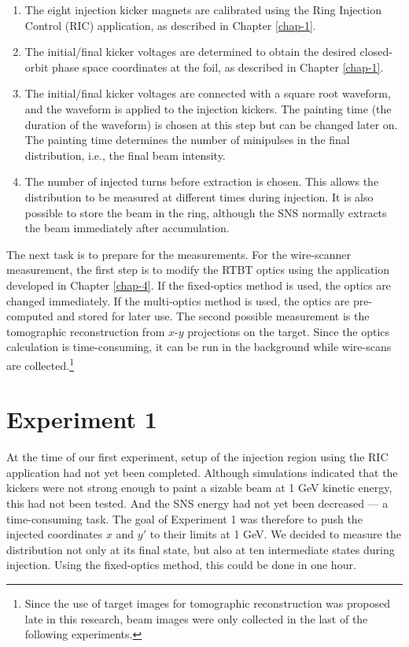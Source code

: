 \begin{enumerate}
    \item
    The eight injection kicker magnets are calibrated using the Ring Injection Control (RIC) application, as described in Chapter \ref{chap-1}. 
    \item
    The initial/final kicker voltages are determined to obtain the desired closed-orbit phase space coordinates at the foil, as described in Chapter \ref{chap-1}.
    \item
    The initial/final kicker voltages are connected with a square root waveform, and the waveform is applied to the injection kickers. The painting time (the duration of the waveform) is chosen at this step but can be changed later on. The painting time determines the number of minipulses in the final distribution, i.e., the final beam intensity.
    \item
    The number of injected turns before extraction is chosen. This allows the distribution to be measured at different times during injection. It is also possible to store the beam in the ring, although the SNS normally extracts the beam immediately after accumulation.
\end{enumerate}
%
The next task is to prepare for the measurements. For the wire-scanner measurement, the first step is to modify the RTBT optics using the application developed in Chapter \ref{chap-4}. If the fixed-optics method is used, the optics are changed immediately. If the multi-optics method is used, the optics are pre-computed and stored for later use. The second possible measurement is the tomographic reconstruction from $x$-$y$ projections on the target. Since the optics calculation is time-consuming, it can be run in the background while wire-scans are collected.\footnote{Since the use of target images for tomographic reconstruction was proposed late in this research, beam images were only collected in the last of the following experiments.}


\section{Experiment 1}

At the time of our first experiment, setup of the injection region using the RIC application had not yet been completed. Although simulations indicated that the kickers were not strong enough to paint a sizable beam at 1 GeV kinetic energy, this had not been tested. And the SNS energy had not yet been decreased — a time-consuming task. The goal of Experiment 1 was therefore to push the injected coordinates $x$ and $y'$ to their limits at 1 GeV. We decided to measure the distribution not only at its final state, but also at ten intermediate states during injection. Using the fixed-optics method, this could be done in one hour.


